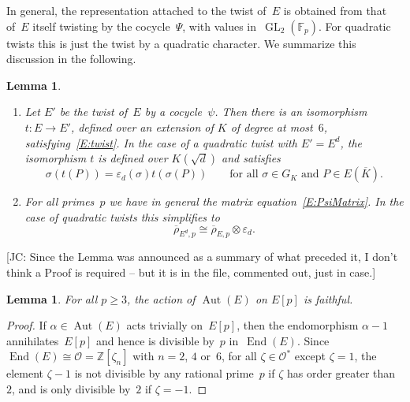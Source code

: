 \documentclass[12pt, reqno]{amsart}
\newcommand{\F}{\mathbb{F}}
\newcommand{\Z}{\mathbb{Z}}
\newcommand{\Kbar}{{\overline{K}}}
\newcommand{\rhobar}{{\overline{\rho}}}
\newcommand{\eps}{\varepsilon}
\newcommand{\calO}{\mathcal{O}}
\DeclareMathOperator{\Aut}{Aut}
\DeclareMathOperator{\End}{End}
\newcommand{\GL}{\operatorname{GL}}
\numberwithin{equation}{section}
\newtheorem{lemma}[theorem]{Lemma}
\theoremstyle{definition}
\theoremstyle{remark}
\newcommand{\jc}[1]{{\color{darkgreen} \textsf{[JC: #1]}}}
\begin{document}
In general, the representation attached to the twist of~$E$ is
obtained from that of~$E$ itself twisting by the cocycle~$\Psi$, with
values in~$\GL_2(\F_p)$.  For quadratic twists this is just the twist
by a quadratic character.
We summarize this discussion in the following.

\begin{lemma}\label{L:twist-rep}
  \begin{enumerate}
\item Let $E'$ be the twist of~$E$ by a cocycle~$\psi$. Then there is
  an isomorphism $t :E\to E'$, defined over an extension of $K$ of
  degree at most~$6$, satisfying~\eqref{E:twist}.
  In the case of a quadratic twist with $E'=E^d$, the isomorphism $t$
  is defined over $K(\sqrt{d})$ and satisfies
\begin{equation}\label{E:iso-twist}
\sigma(t (P)) = \eps_d(\sigma)t (\sigma(P)) \qquad\text{for
  all~$\sigma\in G_K$ and $P\in E(\Kbar)$}.
\end{equation}
\item For all primes~$p$ we have in general the matrix
  equation~\eqref{E:PsiMatrix}.
In the case of quadratic twists this simplifies to
  \begin{equation} \label{E:rho-twist}
  \rhobar_{E^d,p} \cong \rhobar_{E,p}\otimes\eps_d.
\end{equation}
\end{enumerate}
\end{lemma}

\jc{Since the Lemma was announced as a summary of what preceded it, I
  don't think a Proof is required -- but it is in the file, commented
  out, just in case.}
\begin{comment}
\begin{proof}
Equation (\ref{E:iso-twist}) is a special case
of~\eqref{E:twist}. Relation (\ref{E:rho-twist}) follows immediately
from (\ref{E:iso-twist}) and also from the matrix
equation~\eqref{E:PsiMatrix} since
$\Psi_{\sigma}=\varepsilon_d(\sigma)I$.
\end{proof}
\end{comment}

\begin{lemma} \label{L:faithful}
  For all $p\ge3$, the action of $\Aut(E)$ on $E[p]$ is faithful.
\end{lemma}
\begin{proof}
If $\alpha\in\Aut(E)$ acts trivially on~$E[p]$, then the endomorphism
$\alpha-1$ annihilates~$E[p]$ and hence is divisible by~$p$
in~$\End(E)$.  Since $\End(E)\cong\calO=\Z[\zeta_n]$ with $n=2$, $4$
or~$6$, for all $\zeta\in \calO^*$ except $\zeta=1$, the element
$\zeta-1$ is not divisible by any rational prime~$p$ if $\zeta$
has order greater than~$2$, and is only divisible by~$2$ if
$\zeta=-1$.
\end{proof}
\end{document}
